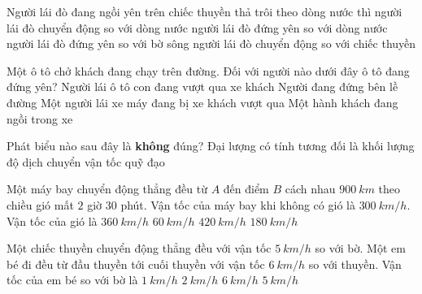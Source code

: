 \begin{ex}%
Người lái đò đang ngồi yên trên chiếc thuyền thả trôi theo dòng nước thì
\choice
{người lái đò chuyển động so với dòng nước}
{\True người lái đò đứng yên so với dòng nước}
{người lái đò đứng yên so với bờ sông}
{người lái đò chuyển động so với chiếc thuyền}
 \end{ex}

\begin{ex}%
Một ô tô chở khách đang chạy trên đường. Đối với người nào dưới đây ô tô đang đứng yên?
\choice
{Người lái ô tô con đang vượt qua xe khách}
{Người đang đứng bên lề đường}
{Một người lái xe máy đang bị xe khách vượt qua}
{\True Một hành khách đang ngồi trong xe}
 \end{ex}

\begin{ex}%
Phát biểu nào sau đây là \textbf{không} đúng? Đại lượng có tính tương đối là
\choice
{\True khối lượng}
{độ dịch chuyển}
{vận tốc}
{quỹ đạo}
 \end{ex}

\begin{ex}%
Một máy bay chuyển động thẳng đều từ $A$ đến điểm $B$ cách nhau $900\ km$ theo chiều gió mất $2$ giờ $30$ phút. Vận tốc của máy bay khi không có gió là $300\ km/h$. Vận tốc của gió là
\choice
{$360\ km/h$}
{\True $60\ km/h$}
{$420\ km/h$}
{$180\ km/h$}
\end{ex}


\begin{ex}%
Một chiếc thuyền chuyển động thẳng đều với vận tốc $5\ km/h$ so với bờ. Một em bé đi đều từ đầu thuyền tới cuối thuyền với vận tốc $6\ km/h$ so với thuyền. Vận tốc của em bé so với bờ là
\choice
{\True $1\ km/h$}
{$2\ km/h$}
{$6\ km/h$}
{$5\ km/h$}
\end{ex}

